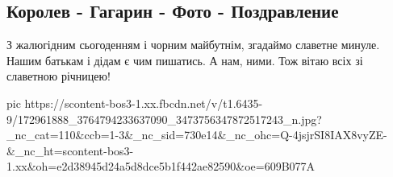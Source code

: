  
 
 
 
 

\subsection{Королев - Гагарин - Фото - Поздравление}

З жалюгідним сьогоденням і чорним майбутнім, згадаймо славетне минуле. Нашим
батькам і дідам є чим пишатись. А нам, ними. Тож вітаю всіх зі славетною
річницею!


\ifcmt
  pic https://scontent-bos3-1.xx.fbcdn.net/v/t1.6435-9/172961888_3764794233637090_3473756347872517243_n.jpg?_nc_cat=110&ccb=1-3&_nc_sid=730e14&_nc_ohc=Q-4jsjrSI8IAX8vyZE-&_nc_ht=scontent-bos3-1.xx&oh=e2d38945d24a5d8dce5b1f442ae82590&oe=609B077A
\fi

